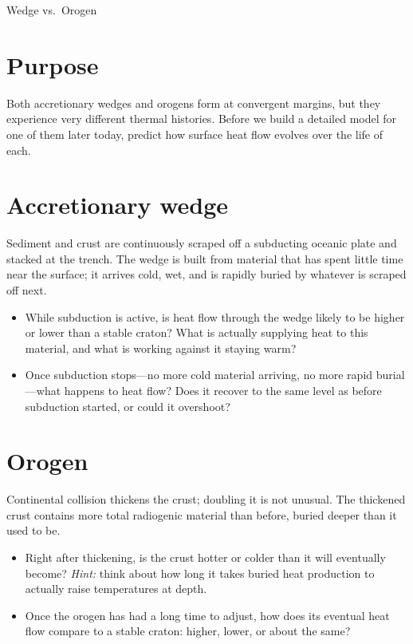 \begin{activity}[Warm-up]{Wedge vs.\ Orogen}

\section*{Purpose}
Both accretionary wedges and orogens form at convergent margins, but they experience very different thermal histories. Before we build a detailed model for one of them later today, predict how surface heat flow evolves over the life of each.

\section*{Accretionary wedge}
Sediment and crust are continuously scraped off a subducting oceanic plate and stacked at the trench. The wedge is built from material that has spent little time near the surface; it arrives cold, wet, and is rapidly buried by whatever is scraped off next.

\begin{itemize}
  \item While subduction is active, is heat flow through the wedge likely to be higher or lower than a stable craton? What is actually supplying heat to this material, and what is working against it staying warm?
  \answerbox[2cm]

  \item Once subduction stops---no more cold material arriving, no more rapid burial---what happens to heat flow? Does it recover to the same level as before subduction started, or could it overshoot?
  \answerbox[2cm]
\end{itemize}

\section*{Orogen}
Continental collision thickens the crust; doubling it is not unusual. The thickened crust contains more total radiogenic material than before, buried deeper than it used to be.

\begin{itemize}
  \item Right after thickening, is the crust hotter or colder than it will eventually become? \emph{Hint:} think about how long it takes buried heat production to actually raise temperatures at depth.
  \answerbox[2cm]

  \item Once the orogen has had a long time to adjust, how does its eventual heat flow compare to a stable craton: higher, lower, or about the same?
  \answerbox[2cm]
\end{itemize}


\end{activity}
